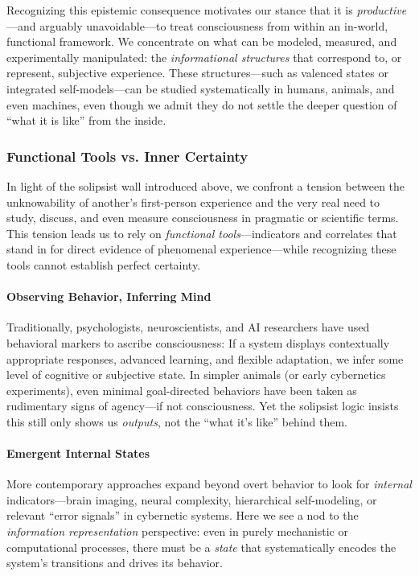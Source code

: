 \documentclass[12pt]{article}
\begin{document}
Recognizing this epistemic consequence motivates our stance that it is \textit{productive}---and arguably unavoidable---to treat consciousness from within an in-world, functional framework. We concentrate on what can be modeled, measured, and experimentally manipulated: the \textit{informational structures} that correspond to, or represent, subjective experience. These structures---such as valenced states or integrated self-models---can be studied systematically in humans, animals, and even machines, even though we admit they do not settle the deeper question of ``what it is like'' from the inside.

\subsubsection{Functional Tools vs. Inner Certainty}

In light of the solipsist wall introduced above, we confront a tension between the unknowability of another's first-person experience and the very real need to study, discuss, and even measure consciousness in pragmatic or scientific terms. This tension leads us to rely on \textit{functional tools}---indicators and correlates that stand in for direct evidence of phenomenal experience---while recognizing these tools cannot establish perfect certainty.

\paragraph{Observing Behavior, Inferring Mind}

Traditionally, psychologists, neuroscientists, and AI researchers have used behavioral markers to ascribe consciousness: If a system displays contextually appropriate responses, advanced learning, and flexible adaptation, we infer some level of cognitive or subjective state. In simpler animals (or early cybernetics experiments), even minimal goal-directed behaviors have been taken as rudimentary signs of agency---if not consciousness. Yet the solipsist logic insists this still only shows us \textit{outputs}, not the ``what it's like'' behind them.

\paragraph{Emergent Internal States}

More contemporary approaches expand beyond overt behavior to look for \textit{internal} indicators---brain imaging, neural complexity, hierarchical self-modeling, or relevant ``error signals'' in cybernetic systems. Here we see a nod to the \textit{information representation} perspective: even in purely mechanistic or computational processes, there must be a \textit{state} that systematically encodes the system's transitions and drives its behavior.
\end{document}
